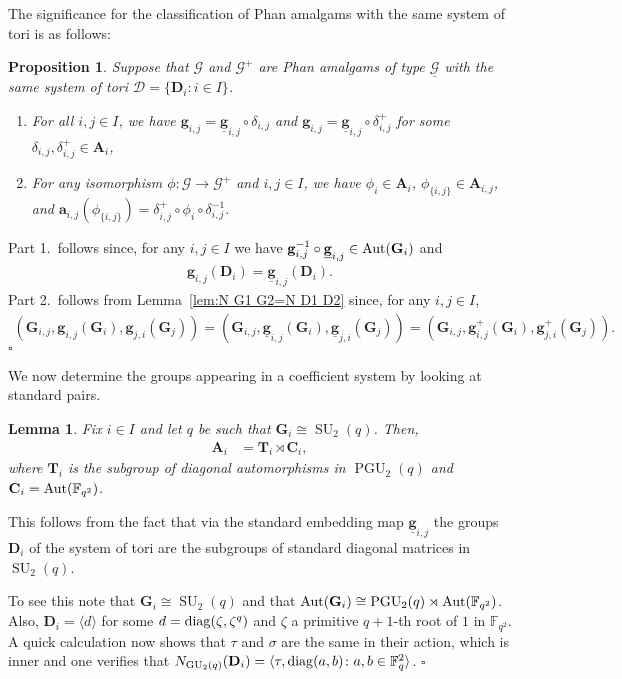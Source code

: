 \documentclass[12pt]{amsart}
\newtheorem{lemma}[theorem]{Lemma}
\newtheorem{proposition}[theorem]{Proposition}
\theoremstyle{definition}
\newcommand{\bpf}{\noindent{\bf Proof}\hspace{7pt}}
\newcommand{\epf}{\qed}
\newcommand{\ble}{\begin{lemma}}
\newcommand{\ele}{\end{lemma}}
\newcommand{\bpr}{\begin{proposition}}
\newcommand{\epr}{\end{proposition}}
\newcommand{\ul}{\underline}
\newcommand{\cD}{{\mathcal D}}
\newcommand{\Aut}{\mathop{\rm Aut}\nolimits}
\newcommand{\diag}{\mathop{\rm diag}\nolimits}
\def\cD{{\mathcal D}}
\newcommand{\FF}{{\mathbb F}}
\newcommand{\after}{\mathbin{ \circ }}
\DeclareMathOperator{\SU}{SU}
\DeclareMathOperator{\GU}{GU}
\DeclareMathOperator{\PGU}{PGU}
\newcommand{\trin}{\tau}
\renewcommand{\qed}{\hfill $\square$}
\newcommand{\amgrpA}{{\mathbf{A}}}
\newcommand{\amgrpC}{{\mathbf{C}}}
\newcommand{\amgrpD}{{\mathbf{D}}}
\newcommand{\amgrpG}{{\mathbf{G}}}
\newcommand{\amgrpT}{{\mathbf{T}}}
\newcommand{\ama}{{\mathbf a}}
\newcommand{\amg}{{\mathbf g}}
\newcommand{\famg}{\ul{\mathbf g}}
\newcommand{\famG}{\ul{\mathscr{G}}}
\newcommand{\amG}{{\mathscr{G}}}
\begin{document}
\medskip

The significance for the classification of  Phan  amalgams with the same system of tori is as follows:
\bpr\label{prop:P coefficient systems}
Suppose that $\amG$ and $\amG^+$ are  Phan amalgams of type $\famG$ with the same system of tori $\cD=\{\amgrpD_i\colon i\in I\}$.
\begin{enumerate}
\item For all $i,j\in I$, we have $\amg_{i,j}=\famg_{i,j}\after\delta_{i,j}$ and $\amg_{i,j}=\famg_{i,j}\after\delta_{i,j}^+$ for some $\delta_{i,j}, \delta_{i,j}^+\in \amgrpA_i$,
\item For any isomorphism $\phi\colon \amG\to\amG^+$ and $i,j\in I$, we have $\phi_i\in \amgrpA_i$, $\phi_{\{i,j\}}\in \amgrpA_{i,j}$, and $\ama_{i,j}(\phi_{\{i,j\}})=\delta_{i,j}^+\after\phi_i\after\delta_{i,j}^{-1}$.
\end{enumerate}
\epr
\bpf
Part 1.~follows since, for any $i,j\in I$ we have $\amg_{i,j}^{-1}\after\famg_{i,j}\in \Aut(\amgrpG_i)$ and  
\begin{align*}
\amg_{i,j}(\amgrpD_i)=\famg_{i,j}(\amgrpD_i).
\end{align*}
Part 2.~follows from Lemma~\ref{lem:N G1 G2=N D1 D2} since, for any $i,j\in I$,  
\begin{align*}
(\amgrpG_{i,j},\amg_{i,j}(\amgrpG_i),\amg_{j,i}(\amgrpG_j))
=(\amgrpG_{i,j},\famg_{i,j}(\amgrpG_i),\famg_{j,i}(\amgrpG_j)) =(\amgrpG_{i,j},\amg^+_{i,j}(\amgrpG_i),\amg^+_{j,i}(\amgrpG_j)).
\end{align*}
\epf

We now determine the groups appearing in a coefficient system by looking at standard pairs.
\ble\label{lem:structure of Phan A_i groups}
Fix $i\in I$ and let $q$ be such that $\amgrpG_i\cong\SU_2(q)$.
Then, 
\begin{align*}
\amgrpA_i&=\amgrpT_i\rtimes \amgrpC_i,
\end{align*}
where $\amgrpT_i$ is the subgroup of diagonal automorphisms in $\PGU_2(q)$ and $\amgrpC_i=\Aut(\FF_{q^2})$.
\ele
\bpf
This follows from the fact that via the standard embedding map $\famg_{i,j}$ the groups $\amgrpD_i$  of the system of tori are the subgroups of standard diagonal matrices in $\SU_2(q)$.

To see this note that $\amgrpG_i\cong\SU_2(q)$ and that $\Aut(\amgrpG_i)\cong\PGU_2(q)\rtimes\Aut(\FF_{q^2})$.
Also, $\amgrpD_i=\langle d\rangle$ for some $d=\diag(\zeta,\zeta^q)$ and $\zeta$ a primitive $q+1$-th root of $1$ in $\FF_{q^2}$.
A quick calculation now shows that $\tau$ and  $\sigma$ are the same in their action, which is inner and one verifies that $N_{\GU_2(q)}(\amgrpD_i)=\langle \trin,\diag(a,b)\colon a,b\in \FF_q^2\rangle$.
\epf
\end{document}
